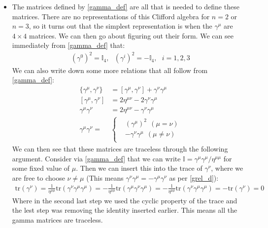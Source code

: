 \documentclass[11pt]{article}
\numberwithin{equation}{section}
\begin{document}
\begin{itemize}
  \item The matrices defined by \ref{gamma_def} are all that is needed to define these matrices. There are no representations of this Clifford algebra for $n=2$ or $n=3$, so it turns out that the simplest representation is when the $\gamma^{\mu}$ are $4 \times 4$ matrices. We can then go about figuring out their form. We can see immediately from \ref{gamma_def} that:
  \begin{align}
  \label{gamma^2}
    (\gamma^{0})^2 = \mathbb{I}_{4}, ~~~(\gamma^{i})^2 = -\mathbb{I}_{4},~~~i=1,2,3
  \end{align}
  We can also write down some more relations that all follow from \ref{gamma_def}:
  \begin{subequations}
  \begin{align}
  \label{grel_a}
     \{\gamma^{\mu},\gamma^{\nu}\} &=[\gamma^{\mu},\gamma^{\nu}] + \gamma^{\nu}\gamma^{\mu} \\
      \label{grel_b}
     [\gamma^{\mu},\gamma^{\nu}] &= 2\eta^{\mu\nu}-2\gamma^{\nu}\gamma^{\mu} \\ 
      \label{grel_c}
     \gamma^{\mu}\gamma^{\nu} &= 2\eta^{\mu\nu} - \gamma^{\nu}\gamma^{\mu} \\
      \label{grel_d}
     \gamma^{\mu}\gamma^{\nu} = & \begin{cases}
       & (\gamma^{\mu})^2 ~~(\mu = \nu)\\
       &  -\gamma^{\nu}\gamma^{\mu} ~~(\mu \neq \nu) \\
     \end{cases}
  \end{align}

  \end{subequations}
  We can then see that these matrices are traceless through the following argument. Consider via \ref{gamma_def} that we can write $\mathbb{I} = \gamma^{\mu}\gamma^{\mu}/\eta^{\mu\mu}$ for some fixed value of $\mu$. Then we can insert this into the trace of $\gamma^{\nu}$, where we are free to choose $\nu \neq \mu$ (This means $\gamma^{\nu}\gamma^{\mu}=-\gamma^{\mu}\gamma^{\nu}$ as per \ref{grel_d}): 
  \begin{align*}
    \text{tr}(\gamma^{\nu}) =\frac{1}{\eta^{\mu\mu}}\text{tr}(\gamma^{\nu}\gamma^{\mu}\gamma^{\mu})  = -\frac{1}{\eta^{\mu\mu}}\text{tr}(\gamma^{\mu}\gamma^{\nu}\gamma^{\mu}) = -\frac{1}{\eta^{\mu\mu}}\text{tr}(\gamma^{\nu}\gamma^{\mu}\gamma^{\mu}) = -\text{tr}(\gamma^{\nu}) = 0
  \end{align*}
  Where in the second last step we used the cyclic property of the trace and the lest step was removing the identity inserted earlier. This means all the gamma matrices are traceless. 


\end{itemize}
\end{document}

